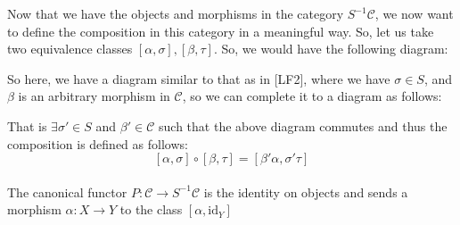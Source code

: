 \documentclass[12pt]{article}
\newcommand{\cat}[1]{\mathscr{#1}}
\begin{document}
Now that we have the objects and morphisms in the category $S^{-1}\cat{C}$, we now want to define the composition in this category in a meaningful way. So, let us take two equivalence classes $[\alpha,\sigma],[\beta,\tau]$. So, we would have the following diagram: 
\begin{center}
\end{center}
\newpage
So here, we have a diagram similar to that as in [LF2], where we have $\sigma \in S$, and $\beta$ is an arbitrary morphism in $\cat{C}$, so we can complete it to a diagram as follows:

\begin{center}
\end{center}

That is $\exists \sigma'\in S$ and $\beta'\in \cat{C}$ such that the above diagram commutes and thus the composition is defined as follows:
\[
[\alpha,\sigma]\circ [\beta,\tau]=[\beta'\alpha,\sigma'\tau]
\]\\
The canonical functor $P: \cat{C}\to S^{-1}\cat{C}$ is the identity on objects and sends a morphism $\alpha:X \to Y$ to the class $[\alpha,\text{id}_Y]$\\
\end{document}
